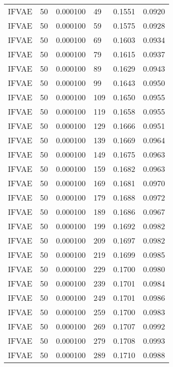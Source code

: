 \begin{tabular}{llrlrr}
   IFVAE &   50 &  0.000100 &    49 &  0.1551 &       0.0920 \\
   IFVAE &   50 &  0.000100 &    59 &  0.1575 &       0.0928 \\
   IFVAE &   50 &  0.000100 &    69 &  0.1603 &       0.0934 \\
   IFVAE &   50 &  0.000100 &    79 &  0.1615 &       0.0937 \\
   IFVAE &   50 &  0.000100 &    89 &  0.1629 &       0.0943 \\
   IFVAE &   50 &  0.000100 &    99 &  0.1643 &       0.0950 \\
   IFVAE &   50 &  0.000100 &   109 &  0.1650 &       0.0955 \\
   IFVAE &   50 &  0.000100 &   119 &  0.1658 &       0.0955 \\
   IFVAE &   50 &  0.000100 &   129 &  0.1666 &       0.0951 \\
   IFVAE &   50 &  0.000100 &   139 &  0.1669 &       0.0964 \\
   IFVAE &   50 &  0.000100 &   149 &  0.1675 &       0.0963 \\
   IFVAE &   50 &  0.000100 &   159 &  0.1682 &       0.0963 \\
   IFVAE &   50 &  0.000100 &   169 &  0.1681 &       0.0970 \\
   IFVAE &   50 &  0.000100 &   179 &  0.1688 &       0.0972 \\
   IFVAE &   50 &  0.000100 &   189 &  0.1686 &       0.0967 \\
   IFVAE &   50 &  0.000100 &   199 &  0.1692 &       0.0982 \\
   IFVAE &   50 &  0.000100 &   209 &  0.1697 &       0.0982 \\
   IFVAE &   50 &  0.000100 &   219 &  0.1699 &       0.0985 \\
   IFVAE &   50 &  0.000100 &   229 &  0.1700 &       0.0980 \\
   IFVAE &   50 &  0.000100 &   239 &  0.1701 &       0.0984 \\
   IFVAE &   50 &  0.000100 &   249 &  0.1701 &       0.0986 \\
   IFVAE &   50 &  0.000100 &   259 &  0.1700 &       0.0983 \\
   IFVAE &   50 &  0.000100 &   269 &  0.1707 &       0.0992 \\
   IFVAE &   50 &  0.000100 &   279 &  0.1708 &       0.0993 \\
   IFVAE &   50 &  0.000100 &   289 &  0.1710 &       0.0988 \\

\end{tabular}
